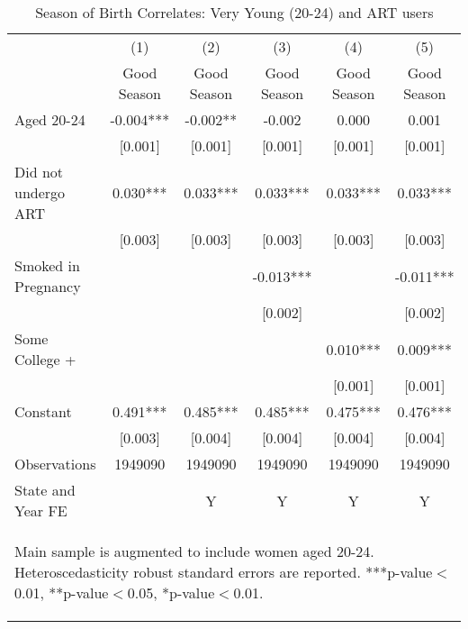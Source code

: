 \documentclass[a4paper, 11.5 pt]{article}
\theoremstyle{plain}
\begin{document}
\begin{doublespace}
\begin{table}[htbp]\centering
\def\sym#1{\ifmmode^{#1}\else\(^{#1}\)\fi}
\caption{Season of Birth Correlates: Very Young (20-24) and ART users\label{tab:ART2024}}
\begin{tabular}{l*{5}{c}}
\toprule
                    &\multicolumn{1}{c}{(1)}   &\multicolumn{1}{c}{(2)}   &\multicolumn{1}{c}{(3)}   &\multicolumn{1}{c}{(4)}   &\multicolumn{1}{c}{(5)}   \\
                    & Good Season   & Good Season   & Good Season   & Good Season   & Good Season   \\
\midrule
Aged 20-24          &      -0.004***&      -0.002** &      -0.002   &       0.000   &       0.001   \\
                    &     [0.001]   &     [0.001]   &     [0.001]   &     [0.001]   &     [0.001]   \\
Did not undergo ART &       0.030***&       0.033***&       0.033***&       0.033***&       0.033***\\
                    &     [0.003]   &     [0.003]   &     [0.003]   &     [0.003]   &     [0.003]   \\
Smoked in Pregnancy &               &               &      -0.013***&               &      -0.011***\\
                    &               &               &     [0.002]   &               &     [0.002]   \\
Some College +      &               &               &               &       0.010***&       0.009***\\
                    &               &               &               &     [0.001]   &     [0.001]   \\
Constant            &       0.491***&       0.485***&       0.485***&       0.475***&       0.476***\\
                    &     [0.003]   &     [0.004]   &     [0.004]   &     [0.004]   &     [0.004]   \\
\midrule
Observations        &     1949090   &     1949090   &     1949090   &     1949090   &     1949090   \\
State and Year FE&&Y&Y&Y&Y\\  \bottomrule
\multicolumn{6}{p{15cm}}{\begin{footnotesize}Main sample is augmented to include women aged 20-24. Heteroscedasticity robust standard errors are reported.
***p-value$<$0.01, **p-value$<$0.05, *p-value$<$0.01.
 \end{footnotesize}}\end{tabular}\end{table}





\end{doublespace}
\end{document}
